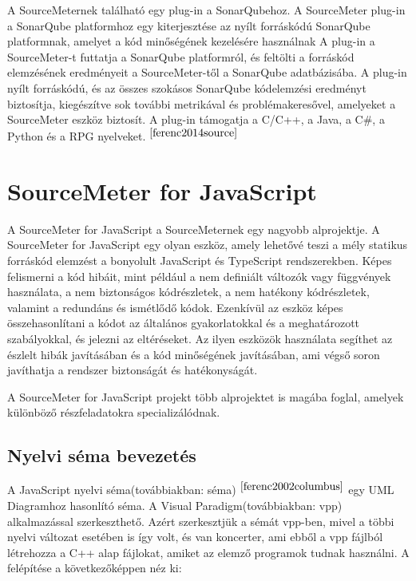 \noindent

A SourceMeternek található egy plug-in a SonarQubehoz.
A SourceMeter plug-in a SonarQube platformhoz egy kiterjesztése az nyílt forráskódú SonarQube platformnak, amelyet a kód minőségének kezelésére használnak
A plug-in a SourceMeter-t futtatja a SonarQube platformról, és feltölti a forráskód elemzésének eredményeit a SourceMeter-től a SonarQube adatbázisába.
A plug-in nyílt forráskódú, és az összes szokásos SonarQube kódelemzési eredményt biztosítja, kiegészítve sok további metrikával és problémakeresővel, amelyeket a SourceMeter eszköz biztosít.
A plug-in támogatja a C/C++, a Java, a C\#, a Python és a RPG nyelveket.$^{~\cite{ferenc2014source}}$

\section{SourceMeter for JavaScript}

\noindent

A SourceMeter for JavaScript a SourceMeternek egy nagyobb alprojektje.
A SourceMeter for JavaScript egy olyan eszköz, amely lehetővé teszi a mély statikus forráskód elemzést a bonyolult JavaScript és TypeScript rendszerekben.
Képes felismerni a kód hibáit, mint például a nem definiált változók vagy függvények használata, a nem biztonságos kódrészletek, a nem hatékony kódrészletek, valamint a redundáns és ismétlődő kódok.
Ezenkívül az eszköz képes összehasonlítani a kódot az általános gyakorlatokkal és a meghatározott szabályokkal, és jelezni az eltéréseket.
Az ilyen eszközök használata segíthet az észlelt hibák javításában és a kód minőségének javításában, ami végső soron javíthatja a rendszer biztonságát és hatékonyságát.

\noindent

A SourceMeter for JavaScript projekt több alprojektet is magába foglal, amelyek különböző részfeladatokra specializálódnak.

\subsection{Nyelvi séma bevezetés}\label{chap:nyelvi_sema}

\noindent

A JavaScript nyelvi séma(továbbiakban: séma)$^{~\cite{ferenc2002columbus}}$  egy UML Diagramhoz hasonlító séma.
A Visual Paradigm(továbbiakban: vpp) alkalmazással szerkeszthető.
Azért szerkesztjük a sémát vpp-ben, mivel a többi nyelvi változat esetében is így volt, és van koncerter, ami ebből a vpp fájlból létrehozza a C++ alap fájlokat, amiket az elemző programok tudnak használni.
A felépítése a következőképpen néz ki:

